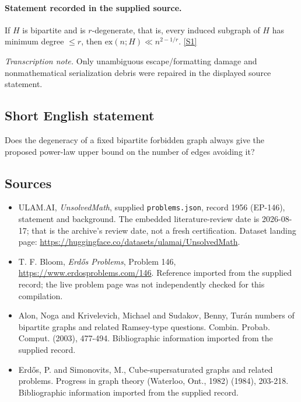 \documentclass[11pt,a4paper]{article}
\newcommand{\sref}[2]{\hyperlink{source:#1:#2}{[S#2]}}
\begin{document}
\paragraph{Statement recorded in the supplied source.}
If $H$ is bipartite and is $r$-degenerate, that is, every induced subgraph of $H$ has minimum degree $\leq r$, then $ \mathrm{ex}(n;H) \ll n^{2-1/r}. $ \sref{1956}{1}

{\small\emph{Transcription note.} Only unambiguous escape/formatting damage and nonmathematical serialization debris were repaired in the displayed source statement.}

\subsection{Short English statement}

Does the degeneracy of a fixed bipartite forbidden graph always give the proposed power-law upper bound on the number of edges avoiding it?

\subsection{Sources}

{\small

\begin{itemize}

\item[\hypertarget{source:1956:1}{S1}] ULAM.AI, \emph{UnsolvedMath}, supplied \texttt{problems.json}, record 1956 (EP-146), statement and background. The embedded literature-review date is 2026-08-17; that is the archive’s review date, not a fresh certification. Dataset landing page: \url{https://huggingface.co/datasets/ulamai/UnsolvedMath}.

\item[\hypertarget{source:1956:2}{S2}] T. F. Bloom, \emph{Erdős Problems}, Problem 146, \url{https://www.erdosproblems.com/146}. Reference imported from the supplied record; the live problem page was not independently checked for this compilation.

\item[\hypertarget{source:1956:3}{S3}] Alon, Noga and Krivelevich, Michael and Sudakov, Benny, Tur\'{a}n numbers of bipartite graphs and related Ramsey-type questions. Combin. Probab. Comput. (2003), 477-494. Bibliographic information imported from the supplied record.

\item[\hypertarget{source:1956:4}{S4}] Erd\H{o}s, P. and Simonovits, M., Cube-supersaturated graphs and related problems. Progress in graph theory (Waterloo, Ont., 1982) (1984), 203-218. Bibliographic information imported from the supplied record.

\end{itemize}

}

\label{end:1956}
\end{document}
